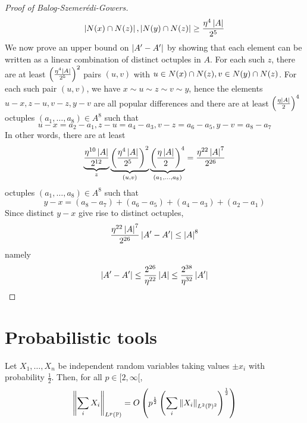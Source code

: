 \documentclass{article}
\begin{document}
\begin{proof}[Proof of Balog-Szemerédi-Gowers]
  $$\left\lvert N(x) \cap N(z)\right\rvert, \left\lvert N(y) \cap N(z)\right\rvert \ge \frac{\eta^4\left\lvert A\right\rvert}{2^5}$$
  We now prove an upper bound on $\left\lvert A' - A'\right\rvert$ by showing that each element can be written as a linear combination of distinct octuples in $A$. For each such $z$, there are at least $\left(\frac{\eta^4\left\lvert A\right\rvert}{2^5}\right)^2$ pairs $(u, v)$ with $u \in N(x) \cap N(z), v \in N(y) \cap N(z)$. For each such pair $(u, v)$, we have $x \sim u \sim z \sim v \sim y$, hence the elements $u - x, z - u, v - z, y - v$ are all popular differences and there are at least $\left(\frac{\eta\left\lvert A\right\rvert}2\right)^4$ octuples $(a_1, \dots, a_8) \in A^8$ such that
  $$u - x = a_2 - a_1, z - u = a_4 - a_3, v - z = a_6 - a_5, y - v = a_8 - a_7$$
  In other words, there are at least
  $$\underbrace{\frac{\eta^{10}\left\lvert A\right\rvert}{2^{12}}}_z
    \underbrace{\left(\frac{\eta^4\left\lvert A\right\rvert}{2^5}\right)^2}_{(u, v)}
    \underbrace{\left(\frac{\eta\left\lvert A\right\rvert}2\right)^4}_{(a_1, \dots, a_8)} = \frac{\eta^{22}\left\lvert A\right\rvert^7}{2^{26}}$$
  octuples $(a_1, \dots, a_8) \in A^8$ such that
  $$y - x = (a_8 - a_7) + (a_6 - a_5) + (a_4 - a_3) + (a_2 - a_1)$$
  Since distinct $y - x$ give rise to distinct octuples,
  $$\frac{\eta^{22}\left\lvert A\right\rvert^7}{2^{26}} \left\lvert A' - A'\right\rvert \le \left\lvert A\right\rvert^8$$
  namely
  $$\left\lvert A' - A'\right\rvert \le \frac{2^{26}}{\eta^{22}}\left\lvert A\right\rvert \le \frac{2^{38}}{\eta^{32}}\left\lvert A'\right\rvert$$
\end{proof}

\clearpage
\section{Probabilistic tools}

\begin{nprop}
  Let $X_1, \dots, X_n$ be independent random variables taking values $\pm x_i$ with probability $\frac 12$. Then, for all $p \in [2, \infty[$,
  $$\left\lVert \sum_i X_i\right\rVert_{L^p(\mathbb P)} = O\left(p^{\frac 12}\left(\sum_i \left\lVert X_i\right\rVert_{L^2(\mathbb P)^2}\right)^{\frac 12}\right)$$
\end{nprop}

\newlec
\end{document}
